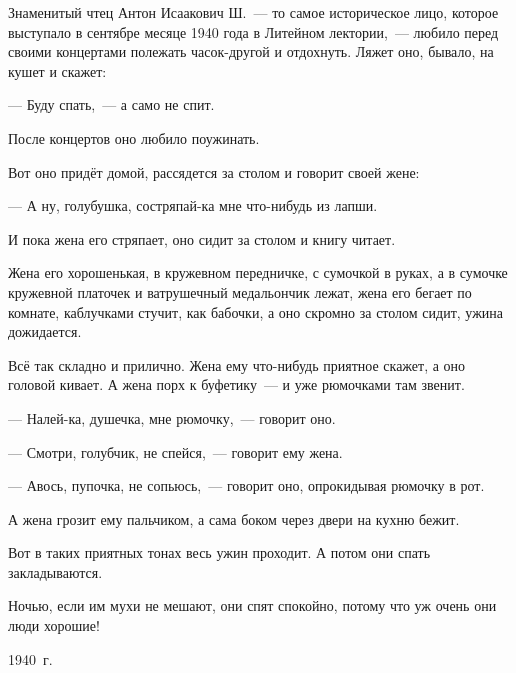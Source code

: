 Знаменитый чтец Антон Исаакович Ш.~--- то самое историческое лицо, которое выступало в сентябре месяце 1940 года в Литейном лектории,~--- любило перед своими концертами полежать часок-другой и отдохнуть. Ляжет оно, бывало, на кушет и скажет:

--- Буду спать,~--- а само не спит.

После концертов оно любило поужинать.

Вот оно придёт домой, рассядется за столом и говорит своей жене:

--- А ну, голубушка, состряпай-ка мне что-нибудь из лапши.

И пока жена его стряпает, оно сидит за столом и книгу читает.

Жена его хорошенькая, в кружевном передничке, с сумочкой в руках, а в сумочке кружевной платочек и ватрушечный медальончик лежат, жена его бегает по комнате, каблучками стучит, как бабочки, а оно скромно за столом сидит, ужина дожидается.

Всё так складно и прилично. Жена ему что-нибудь приятное скажет, а оно головой кивает. А жена порх к буфетику~--- и уже рюмочками там звенит.

--- Налей-ка, душечка, мне рюмочку,~--- говорит оно.

--- Смотри, голубчик, не спейся,~--- говорит ему жена.

--- Авось, пупочка, не сопьюсь,~--- говорит оно, опрокидывая рюмочку в рот.

А жена грозит ему пальчиком, а сама боком через двери на кухню бежит.

Вот в таких приятных тонах весь ужин проходит. А потом они спать закладываются.

Ночью, если им мухи не мешают, они спят спокойно, потому что уж очень они люди хорошие!

1940~г.
